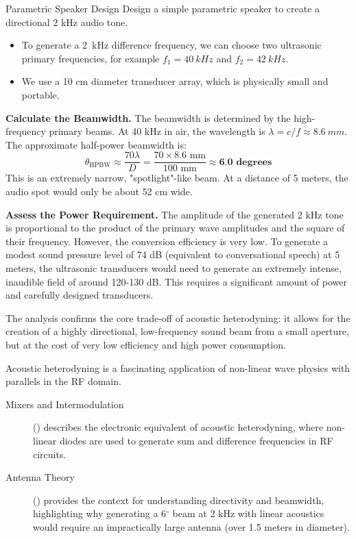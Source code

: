 \begin{workedexample}{Parametric Speaker Design}
     Design a simple parametric speaker to create a directional 2 kHz audio tone.
    \begin{itemize}
        \item To generate a \qty{2}{kHz} difference frequency, we can choose two ultrasonic primary frequencies, for example $f_1 = \qty{40}{kHz}$ and $f_2 = \qty{42}{kHz}$.
        \item We use a 10 cm diameter transducer array, which is physically small and portable.
    \end{itemize}
    \begin{derivationsteps}
        \step \textbf{Calculate the Beamwidth.} The beamwidth is determined by the high-frequency primary beams. At 40 kHz in air, the wavelength is $\lambda = c/f \approx \qty{8.6}{mm}$. The approximate half-power beamwidth is:
        \[ \theta_{\text{HPBW}} \approx \frac{70 \lambda}{D} = \frac{70 \times 8.6 \text{ mm}}{100 \text{ mm}} \approx \textbf{6.0 degrees} \]
        This is an extremely narrow, "spotlight"-like beam. At a distance of 5 meters, the audio spot would only be about 52 cm wide.
        
        \step \textbf{Assess the Power Requirement.} The amplitude of the generated 2 kHz tone is proportional to the product of the primary wave amplitudes and the square of their frequency. However, the conversion efficiency is very low. To generate a modest sound pressure level of 74 dB (equivalent to conversational speech) at 5 meters, the ultrasonic transducers would need to generate an extremely intense, inaudible field of around 120-130 dB. This requires a significant amount of power and carefully designed transducers.
    \end{derivationsteps}
     The analysis confirms the core trade-off of acoustic heterodyning: it allows for the creation of a highly directional, low-frequency sound beam from a small aperture, but at the cost of very low efficiency and high power consumption.
\end{workedexample}


\begin{importantbox}[title={Further Reading}]
    Acoustic heterodyning is a fascinating application of non-linear wave physics with parallels in the RF domain.
    \begin{description}
        \item[Mixers and Intermodulation] () describes the electronic equivalent of acoustic heterodyning, where non-linear diodes are used to generate sum and difference frequencies in RF circuits.
        \item[Antenna Theory] () provides the context for understanding directivity and beamwidth, highlighting why generating a 6$^\circ$ beam at 2 kHz with linear acoustics would require an impractically large antenna (over 1.5 meters in diameter).
    \end{description}
\end{importantbox}